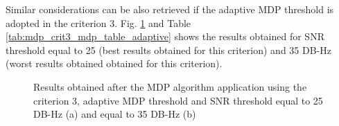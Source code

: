 Similar considerations can be also retrieved if the adaptive MDP threshold is adopted in the criterion 3.  Fig. \ref{FIG:test4mdp_crit3mdpadaptive} and Table \ref{tab:mdp_crit3_mdp_table_adaptive} shows the results obtained for SNR threshold equal to 25 (best results obtained for this criterion) and 35 DB-Hz (worst results obtained obtained for this criterion).

\begin{figure}[H] 
	\centering
    \caption{Results obtained after the MDP algorithm application using the criterion 3, adaptive MDP threshold and SNR threshold equal to 25 DB-Hz (a) and equal to 35 DB-Hz (b)}
	\label{FIG:test4mdp_crit3mdpadaptive} 
\end{figure}

